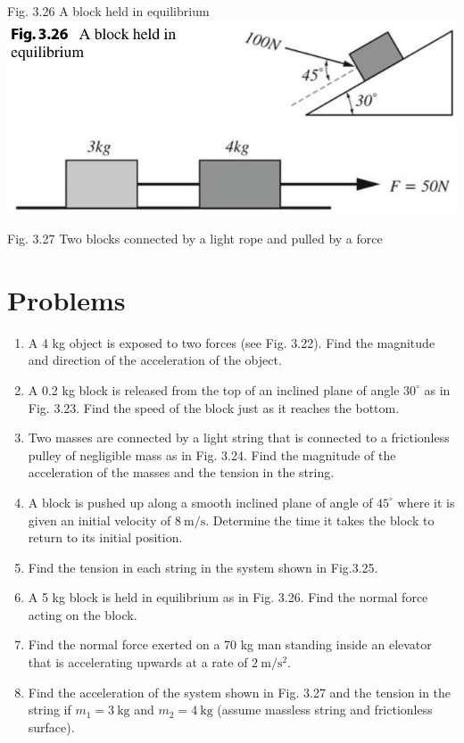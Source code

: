\documentclass[10pt]{article}
\begin{document}
Fig. 3.26 A block held in equilibrium\\
\includegraphics[max width=\textwidth, center]{2024_09_13_db1f357d2aad0a03eb2eg-060(3)}

Fig. 3.27 Two blocks connected by a light rope and pulled by a force

\section*{Problems}
\begin{enumerate}
  \item A 4 kg object is exposed to two forces (see Fig. 3.22). Find the magnitude and direction of the acceleration of the object.
  \item A 0.2 kg block is released from the top of an inclined plane of angle $30^{\circ}$ as in Fig. 3.23. Find the speed of the block just as it reaches the bottom.
  \item Two masses are connected by a light string that is connected to a frictionless pulley of negligible mass as in Fig. 3.24. Find the magnitude of the acceleration of the masses and the tension in the string.
  \item A block is pushed up along a smooth inclined plane of angle of $45^{\circ}$ where it is given an initial velocity of $8 \mathrm{~m} / \mathrm{s}$. Determine the time it takes the block to return to its initial position.
  \item Find the tension in each string in the system shown in Fig.3.25.
  \item A 5 kg block is held in equilibrium as in Fig. 3.26. Find the normal force acting on the block.
  \item Find the normal force exerted on a 70 kg man standing inside an elevator that is accelerating upwards at a rate of $2 \mathrm{~m} / \mathrm{s}^{2}$.
  \item Find the acceleration of the system shown in Fig. 3.27 and the tension in the string if $m_{1}=3 \mathrm{~kg}$ and $m_{2}=4 \mathrm{~kg}$ (assume massless string and frictionless surface).
\end{enumerate}
\end{document}
